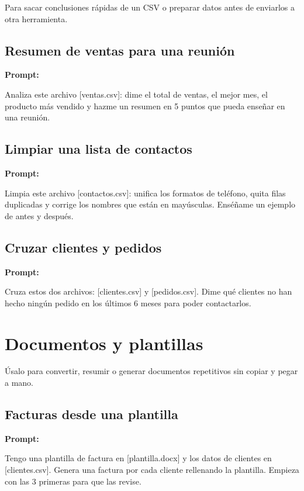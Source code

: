 \documentclass[11pt,a4paper]{report}
\begin{document}
Para sacar conclusiones rápidas de un CSV o preparar datos antes de enviarlos a otra herramienta.

\subsection{Resumen de ventas para una reunión}

\noindent\textbf{Prompt: }
\begin{codebox}
Analiza este archivo [ventas.csv]: dime el total de ventas, el mejor mes, el producto más vendido y hazme un resumen en 5 puntos que pueda enseñar en una reunión.
\end{codebox}

\subsection{Limpiar una lista de contactos}

\noindent\textbf{Prompt: }
\begin{codebox}
Limpia este archivo [contactos.csv]: unifica los formatos de teléfono, quita filas duplicadas y corrige los nombres que están en mayúsculas. Enséñame un ejemplo de antes y después.
\end{codebox}

\subsection{Cruzar clientes y pedidos}

\noindent\textbf{Prompt: }
\begin{codebox}
Cruza estos dos archivos: [clientes.csv] y [pedidos.csv]. Dime qué clientes no han hecho ningún pedido en los últimos 6 meses para poder contactarlos.
\end{codebox}

\section{ Documentos y plantillas}

Úsalo para convertir, resumir o generar documentos repetitivos sin copiar y pegar a mano.

\subsection{Facturas desde una plantilla}

\noindent\textbf{Prompt: }
\begin{codebox}
Tengo una plantilla de factura en [plantilla.docx] y los datos de clientes en [clientes.csv]. Genera una factura por cada cliente rellenando la plantilla. Empieza con las 3 primeras para que las revise.
\end{codebox}
\end{document}
